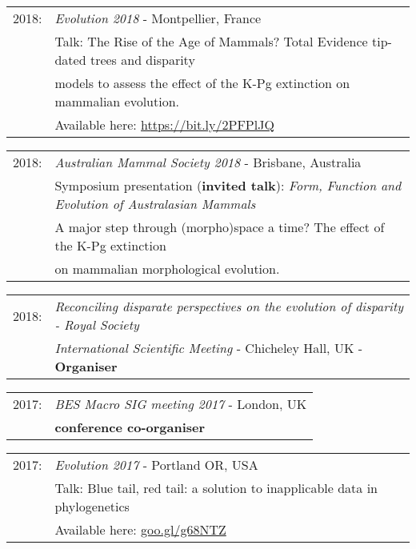 \documentclass[10pt,a4paper]{article}
\begin{document}
{\begin{tabular}{ll}
2018: & \textit{Evolution 2018} - Montpellier, France\\
      & Talk: The Rise of the Age of Mammals? Total Evidence tip-dated trees and disparity\\
      & models to assess the effect of the K-Pg extinction on mammalian evolution.\\
      & Available here: \href{https://figshare.com/articles/Evolution_2018_Talk/6983210}{https://bit.ly/2PFPlJQ}\\
\end{tabular}
\begin{tabular}{ll}
2018: & \textit{Australian Mammal Society 2018} - Brisbane, Australia\\
      & Symposium presentation (\textbf{invited talk}): \textit{Form, Function and Evolution of Australasian Mammals}\\ 
      & A major step through (morpho)space a time? The effect of the K-Pg extinction\\
      & on mammalian morphological evolution.\\
\end{tabular}
\begin{tabular}{ll}
2018: & \textit{Reconciling disparate perspectives on the evolution of disparity - Royal Society}\\
      & \textit{International Scientific Meeting} - Chicheley Hall, UK - \textbf{Organiser}\\
\end{tabular}
\begin{tabular}{ll}
2017: & \textit{BES Macro SIG meeting 2017} - London, UK\\
      & \textbf{conference co-organiser}\\
\end{tabular}
\begin{tabular}{ll}
2017: & \textit{Evolution 2017} - Portland OR, USA\\
      & Talk: Blue tail, red tail: a solution to inapplicable data in phylogenetics\\
      & Available here: \href{https://figshare.com/articles/Guillerme_Evolution2017_pdf/5140222}{goo.gl/g68NTZ}\\
\end{tabular}
\begin{tabular}{ll}

\end{tabular}}
\end{document}
